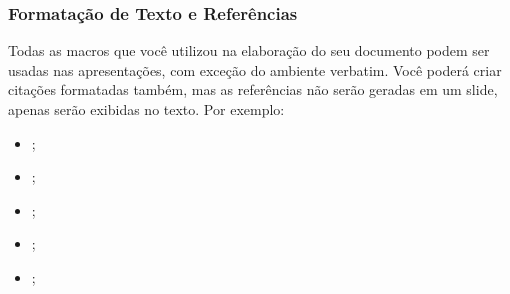 \begin{frame}

    \frametitle{Formatação de Texto e Referências}
    
    Todas as macros que você utilizou na elaboração do seu documento podem ser usadas nas apresentações, com exceção do ambiente verbatim. Você poderá criar citações formatadas também, mas as referências não serão geradas em um slide, apenas serão exibidas no texto. Por exemplo:
    
    \begin{itemize}
        \item \cite{Abedi2014, Agaisse1995};
        \item \cite{AgapitoTenfen2014, BtNomenclature2016, Nelson2014};
        \item {};
        \item {};
        \item {};
    \end{itemize}
         
\end{frame}
